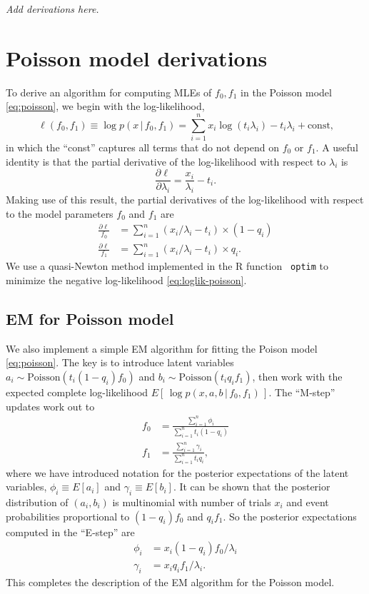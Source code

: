\documentclass[final]{siamart171218}
\begin{document}
{\em Add derivations here.}

\section{Poisson model derivations}

To derive an algorithm for computing MLEs of $f_0, f_1$ in the Poisson
model \eqref{eq:poisson}, we begin with the log-likelihood,
\begin{equation}
\ell(f_0, f_1) \equiv \log p(x \,|\, f_0, f_1) = 
\sum_{i=1}^n x_i \log (t_i \lambda_i) - t_i \lambda_i +
\mbox{const,}
\label{eq:loglik-poisson}
\end{equation}
in which the ``const'' captures all terms that do not depend on $f_0$
or $f_1$. A useful identity is that the partial derivative of the
log-likelihood with respect to $\lambda_i$ is
\begin{equation*}
\frac{\partial\ell}{\partial\lambda_i} = \frac{x_i}{\lambda_i} - t_i.
\end{equation*}
Making use of this result, the partial derivatives of the
log-likelihood with respect to the model parameters $f_0$ and $f_1$
are
\begin{align}
\frac{\partial\ell}{f_0} &= 
\sum_{i=1}^n (x_i/\lambda_i - t_i) \times (1-q_i) \\
\frac{\partial\ell}{f_1} &= 
\sum_{i=1}^n (x_i/\lambda_i - t_i) \times q_i.
\end{align}
We use a quasi-Newton method implemented in the R function {\tt
  optim} to minimize the negative log-likelihood
\eqref{eq:loglik-poisson}.

\subsection{EM for Poisson model} 

We also implement a simple EM algorithm for fitting the Poison model
\eqref{eq:poisson}. The key is to introduce latent variables $a_i \sim
\mathrm{Poisson}(t_i (1-q_i) f_0)$ and $b_i \sim \mathrm{Poisson}(t_i
q_i f_1)$, then work with the expected complete log-likelihood
$E[\,\log p(x, a, b \,|\, f_0, f_1)\,]$. The ``M-step'' updates work
out to
\begin{align}
f_0 &= \frac{\sum_{i=1}^n \phi_i}{\sum_{i=1}^n t_i(1-q_i)} \\
f_1 &= \frac{\sum_{i=1}^n \gamma_i}{\sum_{i=1}^n t_i q_i},
\end{align}
where we have introduced notation for the posterior expectations of
the latent variables, $\phi_i \equiv E[a_i]$ and $\gamma_i \equiv
E[b_i]$. It can be shown that the posterior distribution of $(a_i,
b_i)$ is multinomial with number of trials $x_i$ and event
probabilities proportional to $(1-q_i) f_0$ and $q_i f_1$. So the
posterior expectations computed in the ``E-step'' are
\begin{align}
\phi_i   &= x_i (1 - q_i) f_0 / \lambda_i \\
\gamma_i &= x_i q_i f_1 / \lambda_i.
\end{align}
This completes the description of the EM algorithm for the Poisson
model.
\end{document}
